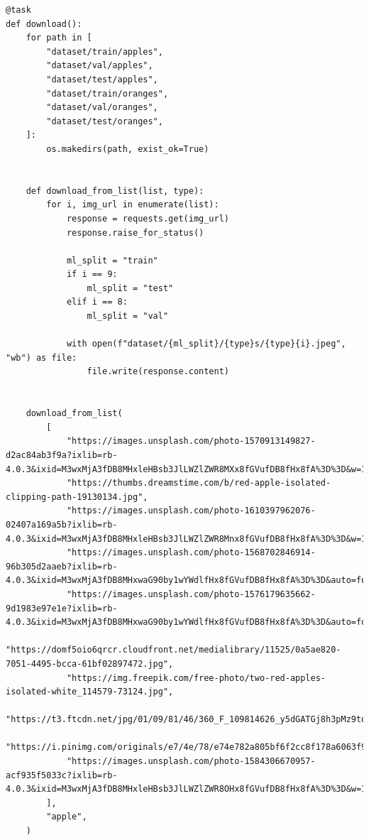 \begin{verbatim}
@task
def download():
    for path in [
        "dataset/train/apples",
        "dataset/val/apples",
        "dataset/test/apples",
        "dataset/train/oranges",
        "dataset/val/oranges",
        "dataset/test/oranges",
    ]:
        os.makedirs(path, exist_ok=True)


    def download_from_list(list, type):
        for i, img_url in enumerate(list):
            response = requests.get(img_url)
            response.raise_for_status()

            ml_split = "train"
            if i == 9:
                ml_split = "test"
            elif i == 8:
                ml_split = "val"

            with open(f"dataset/{ml_split}/{type}s/{type}{i}.jpeg", "wb") as file:
                file.write(response.content)


    download_from_list(
        [
            "https://images.unsplash.com/photo-1570913149827-d2ac84ab3f9a?ixlib=rb-4.0.3&ixid=M3wxMjA3fDB8MHxleHBsb3JlLWZlZWR8MXx8fGVufDB8fHx8fA%3D%3D&w=1000&q=80",
            "https://thumbs.dreamstime.com/b/red-apple-isolated-clipping-path-19130134.jpg",
            "https://images.unsplash.com/photo-1610397962076-02407a169a5b?ixlib=rb-4.0.3&ixid=M3wxMjA3fDB8MHxleHBsb3JlLWZlZWR8Mnx8fGVufDB8fHx8fA%3D%3D&w=1000&q=80",
            "https://images.unsplash.com/photo-1568702846914-96b305d2aaeb?ixlib=rb-4.0.3&ixid=M3wxMjA3fDB8MHxwaG90by1wYWdlfHx8fGVufDB8fHx8fA%3D%3D&auto=format&fit=crop&w=2940&q=80",
            "https://images.unsplash.com/photo-1576179635662-9d1983e97e1e?ixlib=rb-4.0.3&ixid=M3wxMjA3fDB8MHxwaG90by1wYWdlfHx8fGVufDB8fHx8fA%3D%3D&auto=format&fit=crop&w=2787&q=80",
            "https://domf5oio6qrcr.cloudfront.net/medialibrary/11525/0a5ae820-7051-4495-bcca-61bf02897472.jpg",
            "https://img.freepik.com/free-photo/two-red-apples-isolated-white_114579-73124.jpg",
            "https://t3.ftcdn.net/jpg/01/09/81/46/360_F_109814626_y5dGATGj8h3pMz9tq1HNRfiuXR12uFCj.jpg",
            "https://i.pinimg.com/originals/e7/4e/78/e74e782a805bf6f2cc8f178a6063f9d7.jpg",
            "https://images.unsplash.com/photo-1584306670957-acf935f5033c?ixlib=rb-4.0.3&ixid=M3wxMjA3fDB8MHxleHBsb3JlLWZlZWR8OHx8fGVufDB8fHx8fA%3D%3D&w=1000&q=80",
        ],
        "apple",
    )


\end{verbatim}
